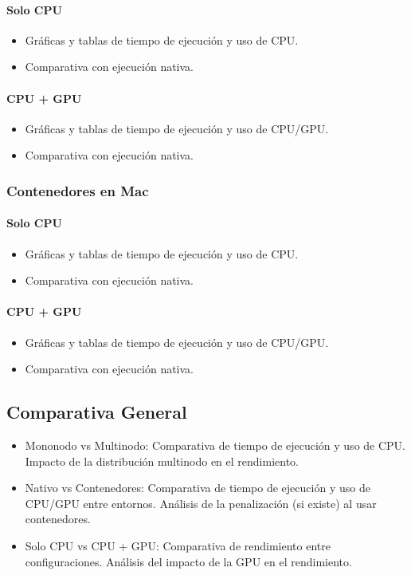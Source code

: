 \paragraph{Solo CPU}
\begin{itemize}
    \item Gráficas y tablas de tiempo de ejecución y uso de CPU.
    \item Comparativa con ejecución nativa.
\end{itemize}
\paragraph{CPU + GPU}
\begin{itemize}
    \item Gráficas y tablas de tiempo de ejecución y uso de CPU/GPU.
    \item Comparativa con ejecución nativa.
\end{itemize}
\subsubsection{Contenedores en Mac}
\paragraph{Solo CPU}
\begin{itemize}
    \item Gráficas y tablas de tiempo de ejecución y uso de CPU.
    \item Comparativa con ejecución nativa.
\end{itemize}
\paragraph{CPU + GPU}
\begin{itemize}
    \item Gráficas y tablas de tiempo de ejecución y uso de CPU/GPU.
    \item Comparativa con ejecución nativa.
\end{itemize}

\subsection{Comparativa General}
\begin{itemize}
    \item Mononodo vs Multinodo: Comparativa de tiempo de ejecución y uso de CPU. Impacto de la distribución multinodo en el rendimiento.
    \item Nativo vs Contenedores: Comparativa de tiempo de ejecución y uso de CPU/GPU entre entornos. Análisis de la penalización (si existe) al usar contenedores.
    \item Solo CPU vs CPU + GPU: Comparativa de rendimiento entre configuraciones. Análisis del impacto de la GPU en el rendimiento.
\end{itemize}

